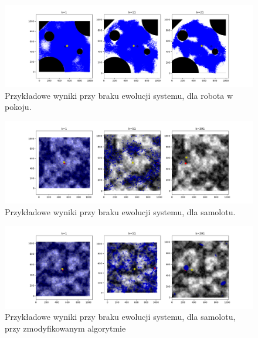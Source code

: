 \begin{figure}[H]
	\begin{center}
		\includegraphics[width=15cm]{./stationary.png}
		\caption{Przykładowe wyniki przy braku ewolucji systemu, dla robota w pokoju.}
		\label{stationary}
	\end{center}
\end{figure}

\begin{figure}[H]
\begin{center}
	\includegraphics[width=15cm]{./stationary_plane.png}
	\caption{Przykładowe wyniki przy braku ewolucji systemu, dla samolotu.}
	\label{stationary_plane}
\end{center}
\end{figure}

\begin{figure}[H]
	\begin{center}
		\includegraphics[width=15cm]{./stationary_evol.png}
		\caption{Przykładowe wyniki przy braku ewolucji systemu, dla samolotu, przy zmodyfikowanym algorytmie}
		\label{stationary_evol}
	\end{center}
\end{figure}



